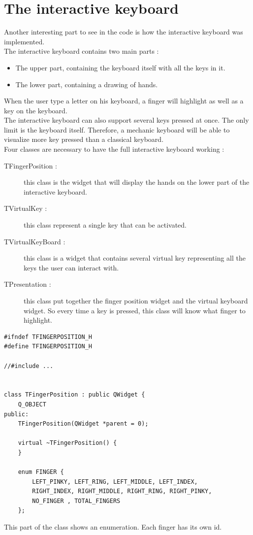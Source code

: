 \section{The interactive keyboard}
Another interesting part to see in the code is how the interactive keyboard was implemented.\\
The interactive keyboard contains two main parts :
\begin{itemize}
	\item The upper part, containing the keyboard itself with all the keys in it.
	\item The lower part, containing a drawing of hands.
\end{itemize}
When the user type a letter on his keyboard, a finger will highlight as well as a key on the keyboard.\\
The interactive keyboard can also support several keys pressed at once. The only limit is the keyboard itself. Therefore, a mechanic keyboard will be able to visualize more key pressed than a classical keyboard.\\
Four classes are necessary to have the full interactive keyboard working :
\begin{description}
	\item[TFingerPosition : ] this class is the widget that will display the hands on the lower part of the interactive keyboard.
	\item[TVirtualKey : ] this class represent a single key that can be activated.
	\item[TVirtualKeyBoard :] this class is a widget that contains several virtual key representing all the keys the user can interact with.
	\item[TPresentation : ] this class put together the finger position widget and the virtual keyboard widget. So every time a key is pressed, this class will know what finger to highlight.
\end{description}

\begin{lstlisting}
#ifndef TFINGERPOSITION_H
#define TFINGERPOSITION_H

//#include ...


class TFingerPosition : public QWidget {
    Q_OBJECT
public:
    TFingerPosition(QWidget *parent = 0);

    virtual ~TFingerPosition() {
    }

    enum FINGER {
        LEFT_PINKY, LEFT_RING, LEFT_MIDDLE, LEFT_INDEX, 
        RIGHT_INDEX, RIGHT_MIDDLE, RIGHT_RING, RIGHT_PINKY,
        NO_FINGER , TOTAL_FINGERS
    };
\end{lstlisting}
This part of the class shows an enumeration. Each finger has its own id.

